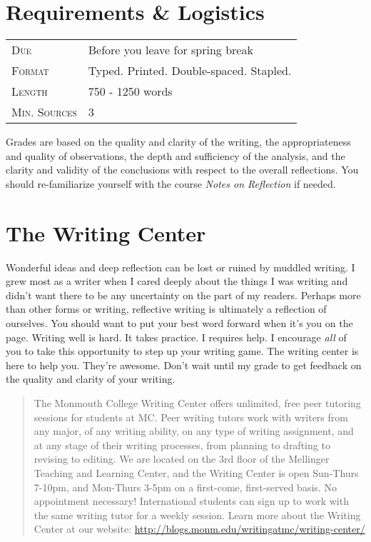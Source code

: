 \documentclass[nobib]{tufte-handout}
\begin{document}
\newpage \thispagestyle{empty}

\section{Requirements \& Logistics}

\begin{tabular}{ll}
\textsc{Due} & Before you leave for spring break  \\
\textsc{Format} & Typed. Printed. Double-spaced. Stapled. \\
\textsc{Length} & 750 - 1250 words \\
\textsc{Min. Sources} & 3
\end{tabular}
\vspace{.25in}

Grades are based on the quality and clarity of the writing, the appropriateness and quality of observations, the depth and sufficiency of the analysis, and the clarity and validity of the conclusions with respect to the overall reflections. You should re-familiarize yourself with the course \textit{Notes on Reflection} if needed. 

\section{The Writing Center}

Wonderful ideas and deep reflection can be lost or ruined by muddled writing.  I grew most as a writer when I cared deeply about the things I was writing and didn't want there to be any uncertainty on the part of my readers. Perhaps more than other forms or writing, reflective writing is ultimately a reflection of ourselves. You should want to put your best word forward when it's you on the page. Writing well is hard. It takes practice. I requires help. I encourage \textit{all} of you to take this opportunity to step up your writing game. The writing center is here to help you. They're awesome. Don't wait until my grade to get feedback on the quality and clarity of your writing.  
\begin{quote}
The Monmouth College Writing Center offers unlimited, free peer tutoring sessions for students at MC.  Peer writing tutors work with writers from any major, of any writing ability, on any type of writing assignment, and at any stage of their writing processes, from planning to drafting to revising to editing.  We are located on the 3rd floor of the Mellinger Teaching and Learning Center, and the Writing Center is open Sun-Thurs 7-10pm, and Mon-Thurs 3-5pm on a first-come, first-served basis.  No appointment necessary!  International students can sign up to work with the same writing tutor for a weekly session. Learn more about the Writing Center at our website: \url{http://blogs.monm.edu/writingatmc/writing-center/}
\end{quote}
\end{document}
